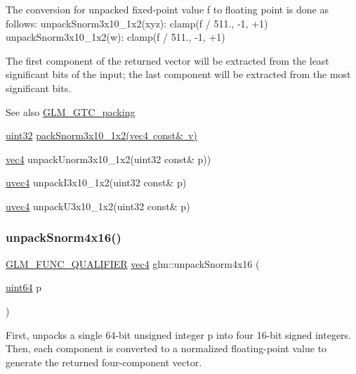 The conversion for unpacked fixed-\/point value f to floating point is done as follows\+: unpack\+Snorm3x10\+\_\+1x2(xyz)\+: clamp(f / 511., -\/1, +1) unpack\+Snorm3x10\+\_\+1x2(w)\+: clamp(f / 511., -\/1, +1)

The first component of the returned vector will be extracted from the least significant bits of the input; the last component will be extracted from the most significant bits.

\begin{DoxySeeAlso}{See also}
\mbox{\hyperlink{group__gtc__packing}{G\+L\+M\+\_\+\+G\+T\+C\+\_\+packing}} 

\mbox{\hyperlink{group__gtc__type__precision_ga202b6a53c105fcb7e531f9b443518451}{uint32}} \mbox{\hyperlink{group__gtc__packing_ga0d4157cec37c0312216a7be1cc92df54}{pack\+Snorm3x10\+\_\+1x2(vec4 const\& v)}} 

\mbox{\hyperlink{group__core__types_ga5881b1b022d7fd1b7218f5916532dd02}{vec4}} unpack\+Unorm3x10\+\_\+1x2(uint32 const\& p)) 

\mbox{\hyperlink{group__core__types_ga1c426d19627b32b14f0089f7f4ba7b1d}{uvec4}} unpack\+I3x10\+\_\+1x2(uint32 const\& p) 

\mbox{\hyperlink{group__core__types_ga1c426d19627b32b14f0089f7f4ba7b1d}{uvec4}} unpack\+U3x10\+\_\+1x2(uint32 const\& p) 
\end{DoxySeeAlso}
\mbox{\label{group__gtc__packing_ga1bfaa3f217fd7a4b6b9d3117ecb3fcac}} 
\subsubsection{\texorpdfstring{unpack\+Snorm4x16()}{unpackSnorm4x16()}}
{\footnotesize\ttfamily \mbox{\hyperlink{setup_8hpp_a33fdea6f91c5f834105f7415e2a64407}{G\+L\+M\+\_\+\+F\+U\+N\+C\+\_\+\+Q\+U\+A\+L\+I\+F\+I\+ER}} \mbox{\hyperlink{group__core__types_ga5881b1b022d7fd1b7218f5916532dd02}{vec4}} glm\+::unpack\+Snorm4x16 (\begin{DoxyParamCaption}\item[{\mbox{\hyperlink{group__gtc__type__precision_gae3632bf9b37da66233d78930dd06378a}{uint64}}}]{p }\end{DoxyParamCaption})}

First, unpacks a single 64-\/bit unsigned integer p into four 16-\/bit signed integers. Then, each component is converted to a normalized floating-\/point value to generate the returned four-\/component vector.

